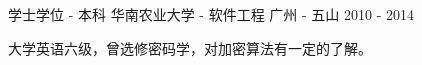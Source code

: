 

\begin{cventries}

  \cventry
    {学士学位 - 本科} %
    {华南农业大学 - 软件工程} %
    {广州 - 五山} %
    {2010 - 2014} %
    {
      \begin{cvitems} %
        \item {大学英语六级，曾选修密码学，对加密算法有一定的了解。}
      \end{cvitems}
    }

\end{cventries}
